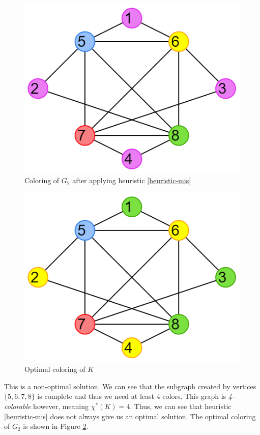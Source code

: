 \documentclass{article}
\newcounter{heuristic} \setcounter{heuristic}{0}
\theoremstyle{definition}
\begin{document}
\begin{multicols}{2}
  \begin{figure}[H]
  \centering
  \includegraphics[scale=0.5]{images/mis-2.png}
  \caption{Coloring of \(G_2\) after applying heuristic \ref{heuristic-mis}}\label{fig:ex2-colored}
  \end{figure}

  \begin{figure}[H]
  \centering
  \includegraphics[scale=0.5]{images/mis-3.png}
  \caption{Optimal coloring of \(K\)}\label{fig:ex2-optimal}
  \end{figure}
\end{multicols}

This is a non-optimal solution. We can see that the subgraph created by vertices \(\{5, 6, 7, 8\}\) is complete and thus we need at least 4 colors. This graph is \emph{4-colorable} however, meaning \(\chi^{*}(K) = 4\). Thus, we can see that heuristic \ref{heuristic-mis} does not always give us an optimal solution. The optimal coloring of $G_2$ is shown in Figure \ref{fig:ex2-optimal}.
\end{document}
